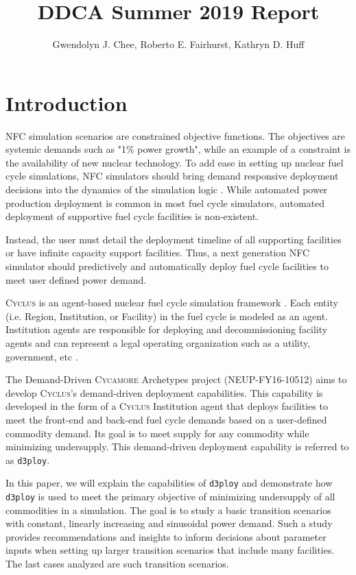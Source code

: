 \documentclass[11pt,letterpaper]{article}
\title{DDCA Summer 2019 Report}
\author{Gwendolyn J. Chee, Roberto E. Fairhurst, Kathryn D. Huff}
\newcommand{\Cyclus}{\textsc{Cyclus}\xspace}%
\newcommand{\Cycamore}{\textsc{Cycamore}\xspace}%
\newcommand{\deploy}{\texttt{d3ploy}\xspace}%
\begin{document}
	\begin{titlepage}
	\maketitle
	\thispagestyle{empty}
	\end{titlepage}

\section{Introduction}
\gls{NFC} simulation scenarios are constrained objective functions. 
The objectives are systemic demands such as "1\% power growth", 
while an example of a constraint is the availability of new nuclear 
technology. 
To add ease in setting up nuclear fuel cycle simulations, \gls{NFC}
simulators should bring demand responsive deployment decisions into 
the dynamics of the simulation logic \cite{huff_current_2017}. 
While automated power production deployment is common in most fuel 
cycle simulators, automated deployment of supportive fuel cycle 
facilities is non-existent. 

Instead, the user must detail the deployment timeline of all 
supporting facilities or have infinite capacity support facilities. 
Thus, a next generation \gls{NFC} simulator should predictively and 
automatically deploy fuel cycle facilities to meet user defined 
power demand. 

\Cyclus is an agent-based nuclear fuel cycle simulation framework 
\cite{huff_fundamental_2016}. 
Each entity (i.e. Region, Institution, or Facility) in the fuel 
cycle is modeled as an agent. 
Institution agents
are responsible for deploying and decommissioning facility agents 
and can represent a legal operating organization such as a 
utility, government, etc \cite{huff_fundamental_2016}. 

The Demand-Driven \Cycamore Archetypes project (NEUP-FY16-10512)
aims to develop \Cyclus's demand-driven deployment capabilities. 
This capability is developed in the form of a \Cyclus Institution
agent that deploys facilities to meet the front-end and back-end 
fuel cycle demands based on a user-defined commodity demand. 
Its goal is to meet supply for any commodity while minimizing 
undersupply.
This demand-driven deployment capability is referred to as 
\deploy. 

In this paper, we will explain the capabilities of \deploy and 
demonstrate how \deploy is used to meet the primary objective
of minimizing undersupply of all commodities in a simulation.
The goal is to study a basic transition scenarios with constant,
linearly increasing and sinusoidal power demand. Such a study
provides recommendations and insights to inform 
decisions about parameter inputs when setting up 
larger transition scenarios that include many facilities.
The last cases analyzed are such transition scenarios.
\end{document}
